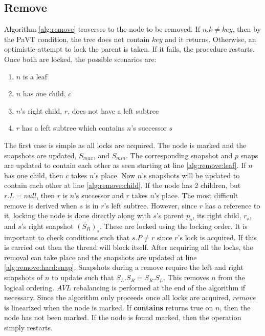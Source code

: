 \documentclass[conference]{IEEEtran}
\theoremstyle{definition}
\theoremstyle{theorem}
\begin{document}
\subsection{Remove}
Algorithm \ref{alg:remove} traverses to the node to be removed. If $n.k\neq key$, then by the PaVT condition, the tree does not contain $key$ and it returns. Otherwise, an optimistic attempt to lock the parent is taken. If it fails, the procedure restarts. Once both are locked, the possible scenarios are:
\begin{enumerate}
\item $n$ is a leaf
\item $n$ has one child, $c$
\item $n$'s right child, $r$, does not have a left subtree
\item $r$ has a left subtree which contains $n$'s successor $s$
\end{enumerate}
The first case is simple as all locks are acquired. The node is marked and the snapshots are updated, $S_{max}$, and $S_{min}$. The corresponding snapshot and $p$ snaps are updated to contain each other as seen starting at line \ref{alg:remove:leaf}. If $n$ has one child, then $c$ takes $n$'s place. Now $n$'s snapshots will be updated to contain each other at line \ref{alg:remove:child}. If the node has 2 children, but $r.L = null$, then $r$ is $n$'s successor and $r$ takes $n$'s place. The most difficult remove is derived when $s$ is in $r$'s left subtree. However, since $r$ has a reference to it, locking the node is done directly along with $s$'s parent $p_s$, its right child, $r_s$, and $s$'s right snapshot $(S_R)_s$. These are locked using the locking order. It is important to check conditions such that $s.P \neq r$ since $r$'s lock is acquired. If this is carried out then the thread will block itself. After acquiring all the locks, the removal can take place and the snapshots are updated at line \ref{alg:remove:hard:snap}. Snapshots during a remove require the left and right snapshots of $n$ to update such that $S_L.S_R = S_R.S_L$. This removes $n$ from the logical ordering. $AVL$ rebalancing is performed at the end of the algorithm if necessary. Since the algorithm only proceeds once all locks are acquired, $remove$ is linearized when the node is marked. If \textbf{contains} returns true on $n$, then the node has not been marked. If the node is found marked, then the operation simply restarts.
\end{document}
